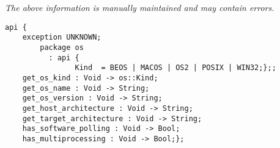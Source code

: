 \label{api:Platform\_Properties}

{\tiny \it The above information is manually maintained and may contain errors.}
\begin{verbatim}
api {
    exception UNKNOWN;
        package os
          : api {
                Kind  = BEOS | MACOS | OS2 | POSIX | WIN32;};;
    get_os_kind : Void -> os::Kind;
    get_os_name : Void -> String;
    get_os_version : Void -> String;
    get_host_architecture : Void -> String;
    get_target_architecture : Void -> String;
    has_software_polling : Void -> Bool;
    has_multiprocessing : Void -> Bool;};
\end{verbatim}

